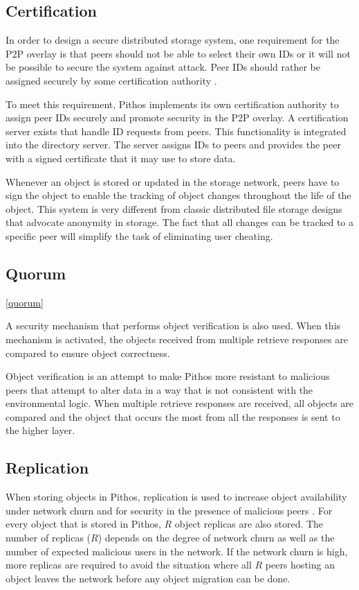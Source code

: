 \subsection{Certification}

In order to design a secure distributed storage system, one requirement for the P2P overlay is that peers should not be able to select their own IDs or it will not be possible to secure the system against attack. Peer IDs should rather be assigned securely by some certification authority \cite{secure_overlay_routing}.

To meet this requirement, Pithos implements its own certification authority to assign peer IDs securely and promote security in the P2P overlay. A certification server exists that handle ID requests from peers. This functionality is integrated into the directory server. The server assigns IDs to peers and provides the peer with a signed certificate that it may use to store data.

Whenever an object is stored or updated in the storage network, peers have to sign the object to enable the tracking of object changes throughout the life of the object. This system is very different from classic distributed file storage designs that advocate anonymity in storage. The fact that all changes can be tracked to a specific peer will simplify the task of eliminating user cheating.

\subsection{Quorum}
\ref{quorum}

A security mechanism that performs object verification is also used. When this mechanism is activated, the objects received from multiple retrieve responses are compared to ensure object correctness.

Object verification is an attempt to make Pithos more resistant to malicious peers that attempt to alter data in a way that is not consistent with the environmental logic. When multiple retrieve responses are received, all objects are compared and the object that occurs the most from all the responses is sent to the higher layer.

\subsection{Replication}

When storing objects in Pithos, replication is used to increase object availability under network churn and for security in the presence of malicious peers \cite{storage_and_chaching_PAST}. For every object that is stored in Pithos, $R$ object replicas are also stored. The number of replicas ($R$) depends on the degree of network churn as well as the number of expected malicious users in the network. If the network churn is high, more replicas are required to avoid the situation where all $R$ peers hosting an object leaves the network before any object migration can be done.

